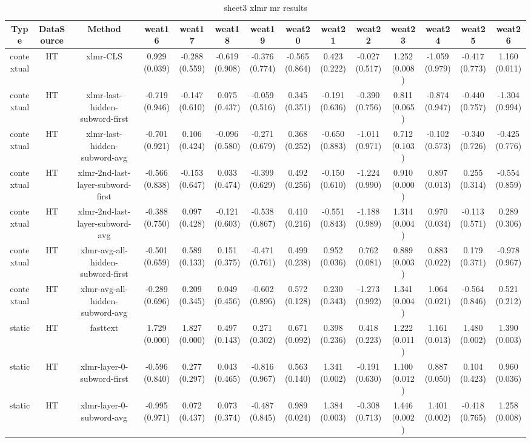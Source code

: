\begin{sidewaystable}[htb]
    \centering
    \caption{sheet3 xlmr mr results}
    \label{appendix_tab:sheet3_xlmr_mr_results}
    \small
    \begin{tabular}{@{}cccccccccccccc@{}}
        \toprule
        Type & DataSource & Method & weat16 & weat17 & weat18 & weat19 & weat20 & weat21 & weat22 & weat23 & weat24 & weat25 & weat26 \\
        \midrule
        contextual & HT & xlmr-CLS & 0.929 (0.039) & -0.288 (0.559) & -0.619 (0.908) & -0.376 (0.774) & -0.565 (0.864) & 0.423 (0.222) & -0.027 (0.517) & 1.252 (0.008) & -1.059 (0.979) & -0.417 (0.773) & 1.160 (0.011) \\
        contextual & HT & xlmr-last-hidden-subword-first & -0.719 (0.946) & -0.147 (0.610) & 0.075 (0.437) & -0.059 (0.516) & 0.345 (0.351) & -0.191 (0.636) & -0.390 (0.756) & 0.811 (0.065) & -0.874 (0.947) & -0.440 (0.757) & -1.304 (0.994) \\
        contextual & HT & xlmr-last-hidden-subword-avg & -0.701 (0.921) & 0.106 (0.424) & -0.096 (0.580) & -0.271 (0.679) & 0.368 (0.252) & -0.650 (0.883) & -1.011 (0.971) & 0.712 (0.103) & -0.102 (0.573) & -0.340 (0.726) & -0.425 (0.776) \\
        contextual & HT & xlmr-2nd-last-layer-subword-first & -0.566 (0.838) & -0.153 (0.647) & 0.033 (0.474) & -0.399 (0.629) & 0.492 (0.256) & -0.150 (0.610) & -1.224 (0.990) & 0.910 (0.000) & 0.897 (0.013) & 0.255 (0.314) & -0.554 (0.859) \\
        contextual & HT & xlmr-2nd-last-layer-subword-avg & -0.388 (0.750) & 0.097 (0.428) & -0.121 (0.603) & -0.538 (0.867) & 0.410 (0.216) & -0.551 (0.843) & -1.188 (0.989) & 1.314 (0.004) & 0.970 (0.034) & -0.113 (0.571) & 0.289 (0.306) \\
        contextual & HT & xlmr-avg-all-hidden-subword-first & -0.501 (0.659) & 0.589 (0.133) & 0.151 (0.375) & -0.471 (0.761) & 0.499 (0.238) & 0.952 (0.036) & 0.762 (0.081) & 0.889 (0.003) & 0.883 (0.022) & 0.179 (0.371) & -0.978 (0.967) \\
        contextual & HT & xlmr-avg-all-hidden-subword-avg & -0.289 (0.696) & 0.209 (0.345) & 0.049 (0.456) & -0.602 (0.896) & 0.572 (0.128) & 0.230 (0.343) & -1.273 (0.992) & 1.341 (0.004) & 1.064 (0.021) & -0.564 (0.846) & 0.521 (0.212) \\
        static & HT & fasttext & 1.729 (0.000) & 1.827 (0.000) & 0.497 (0.143) & 0.271 (0.302) & 0.671 (0.092) & 0.398 (0.236) & 0.418 (0.223) & 1.222 (0.011) & 1.161 (0.013) & 1.480 (0.002) & 1.390 (0.003) \\
        static & HT & xlmr-layer-0-subword-first & -0.596 (0.840) & 0.277 (0.297) & 0.043 (0.465) & -0.816 (0.967) & 0.563 (0.140) & 1.341 (0.002) & -0.191 (0.630) & 1.100 (0.012) & 0.887 (0.050) & 0.104 (0.423) & 0.960 (0.036) \\
        static & HT & xlmr-layer-0-subword-avg & -0.995 (0.971) & 0.072 (0.437) & 0.073 (0.374) & -0.487 (0.845) & 0.989 (0.024) & 1.384 (0.003) & -0.308 (0.713) & 1.446 (0.002) & 1.401 (0.002) & -0.418 (0.765) & 1.258 (0.008) \\
        \bottomrule
    \end{tabular}
\end{sidewaystable}